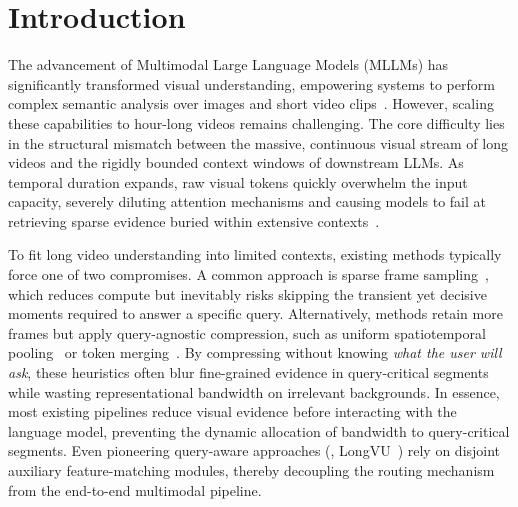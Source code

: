 \section{Introduction}
\label{sec:intro}

The advancement of Multimodal Large Language Models (MLLMs) has significantly transformed visual understanding, empowering systems to perform complex semantic analysis over images and short video clips~\cite{liu2023visual,liu2024improved,zhu2023minigpt,li2024llava,bai2025qwen3,li2025videochat,zhang2024llava,zhang2023video}. However, scaling these capabilities to hour-long videos remains challenging.
%
The core difficulty lies in the structural mismatch between the massive, continuous visual stream of long videos and the rigidly bounded context windows of downstream LLMs.
%
As temporal duration expands, raw visual tokens quickly overwhelm the input capacity, severely diluting attention mechanisms and causing models to fail at retrieving sparse evidence buried within extensive contexts~\cite{liu2024lost}.

To fit long video understanding into limited contexts, existing methods typically force one of two compromises.
%
A common approach is sparse frame sampling~\cite{xu2024pllava,li2025videochat,lin2024video}, which reduces compute but inevitably risks skipping the transient yet decisive moments required to answer a specific query.
%
Alternatively, methods retain more frames but apply query-agnostic compression, such as uniform spatiotemporal pooling~\cite{maaz2024video,jiang2025storm} or token merging~\cite{bolya2022token,li2024videochat,jin2024chat}.
%
By compressing without knowing \emph{what the user will ask}, these heuristics often blur fine-grained evidence in query-critical segments while wasting representational bandwidth on irrelevant backgrounds.
%
In essence, most existing pipelines reduce visual evidence before interacting with the language model, preventing the dynamic allocation of bandwidth to query-critical segments.
%
Even pioneering query-aware approaches (\eg, LongVU~\cite{shen2024longvu}) rely on disjoint auxiliary feature-matching modules, thereby decoupling the routing mechanism from the end-to-end multimodal pipeline.

